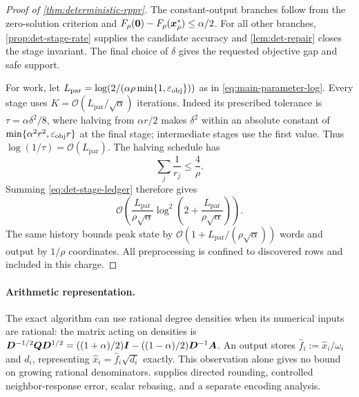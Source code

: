 \begin{proof}[Proof of \cref{thm:deterministic-rppr}]
The constant-output branches follow from the zero-solution criterion and
$F_\rho(\bm{0})-F_\rho(\bm{x}_\rho^*)\leq\alpha/2$.
For all other branches, \cref{prop:det-stage-rate} supplies the candidate
accuracy and \cref{lem:det-repair} closes the stage invariant. The final
choice of $\delta$ gives the requested objective gap and safe support.

For work, let $L_{\mathrm{par}}=\log(2/(\alpha\rho\min\{1,\varepsilon_{\mathrm{obj}}\}))$ as in
\cref{eq:main-parameter-log}. Every stage uses
$K=\mathcal{O}(L_{\mathrm{par}}/\sqrt\alpha)$ iterations. Indeed its prescribed tolerance is
$\tau=\alpha\delta^2/8$, where halving from $\alpha r/2$ makes
$\delta^2$ within an absolute constant of
$\min\{\alpha^2r^2,\varepsilon_{\mathrm{obj}} r\}$ at the final stage; intermediate
stages use the first value. Thus $\log(1/\tau)=\mathcal{O}(L_{\mathrm{par}})$.
The halving schedule has
\begin{equation}
 \sum_j\frac1{r_j}\leq\frac4\rho.
 \label{eq:det-geometric-work}
\end{equation}
Summing \cref{eq:det-stage-ledger} therefore gives
\[
 \mathcal{O}\!\left(\frac{L_{\mathrm{par}}}{\rho\sqrt\alpha}
       \log^2\!\left(2+\frac{L_{\mathrm{par}}}{\rho\sqrt\alpha}\right)\right).
\]
The same history bounds peak state by $\mathcal{O}(1+L_{\mathrm{par}}/(\rho\sqrt\alpha))$ words
and output by $1/\rho$ coordinates. All preprocessing is confined to
discovered rows and included in this charge.
\end{proof}

\paragraph{Arithmetic representation.}
The exact algorithm can use rational degree densities when its numerical
inputs are rational: the matrix acting on densities is
$\bm{D}^{-1/2}\bm{Q}\bm{D}^{1/2}=((1+\alpha)/2)\bm{I}-((1-\alpha)/2)\bm{D}^{-1}\bm{A}$.
An output stores $\widehat f_i:=\widehat x_i/\omega_i$ and $d_i$,
representing $\widehat x_i=\widehat f_i\sqrt{d_i}$ exactly. This observation
alone gives no bound on growing rational denominators.
 supplies directed rounding, controlled
neighbor-response error, scalar rebasing, and a separate encoding analysis.

